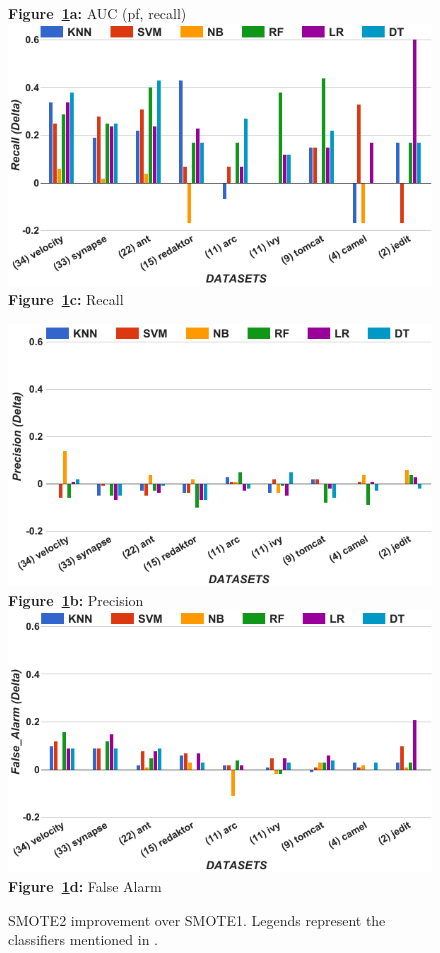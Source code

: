 \begin{figure}[!t]
\begin{minipage}{.5\linewidth}
  {\bf Figure~\ref{fig:tuned}a:} AUC (pf, recall)
        \includegraphics[width=.95\linewidth]{./fig/Recall_tuned.png}
  {\bf Figure~\ref{fig:tuned}c:} Recall
    \end{minipage}%
\begin{minipage}{.5\linewidth}
        \centering
        \includegraphics[width=.95\linewidth]{./fig/prec_tuned.png}
  {\bf Figure~\ref{fig:tuned}b:} Precision
        \includegraphics[width=.95\linewidth]{./fig/pf_tuned.png}
  {\bf Figure~\ref{fig:tuned}d:} False Alarm
    \end{minipage}%
    \caption{SMOTE2 improvement over SMOTE1. Legends represent the classifiers mentioned in .}
    \label{fig:tuned}
\end{figure}

